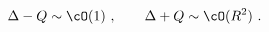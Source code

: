 \begin{equation}
  \Delta - Q \sim \cO (1) ~, \qquad \Delta + Q \sim \cO (R^2) ~.
\label{ppcondition}
\end{equation}

